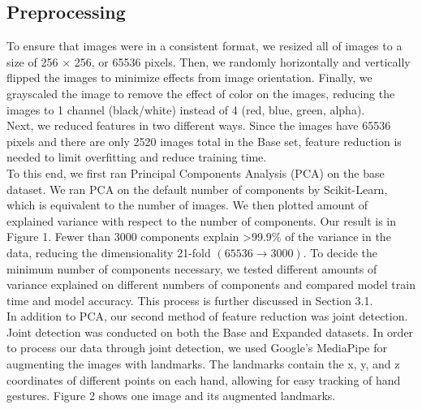 \documentclass{article}
\begin{document}
\subsection{Preprocessing}

To ensure that images were in a consistent format, we resized all of images to a size of 256 $\times$ 256, or 65536 pixels. Then, we randomly horizontally and vertically flipped the images to minimize effects from image orientation. Finally, we grayscaled the image to remove the effect of color on the images, reducing the images to 1 channel (black/white) instead of 4 (red, blue, green, alpha). \\
Next, we reduced features in two different ways. Since the images have 65536 pixels and there are only 2520 images total in the Base set, feature reduction is needed to limit overfitting and reduce training time. \\
To this end, we first ran Principal Components Analysis (PCA) on the base dataset. We ran PCA on the default number of components by Scikit-Learn, which is equivalent to the number of images. We then plotted amount of explained variance with respect to the number of components. Our result is in Figure 1. Fewer than 3000 components explain \textgreater 99.9\% of the variance in the data, reducing the dimensionality 21-fold $(65536 \rightarrow 3000)$. To decide the minimum number of components necessary, we tested different amounts of variance explained on different numbers of components and compared model train time and model accuracy. This process is further discussed in Section 3.1. \\
In addition to PCA, our second method of feature reduction was joint detection. Joint detection was conducted on both the Base and Expanded datasets. In order to process our data through joint detection, we used Google's MediaPipe for augmenting the images with landmarks. The landmarks contain the x, y, and z coordinates of different points on each hand, allowing for easy tracking of hand gestures. Figure 2 shows one image and its augmented landmarks.
\end{document}

